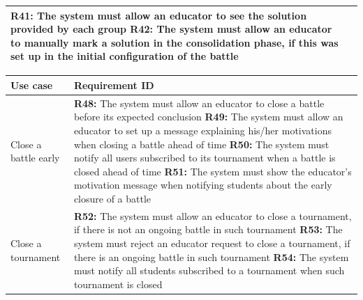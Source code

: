 \documentclass[../RASD.tex]{subfiles}
\begin{document}
\begin{table}[h!]
\begin{center}
\begin{tabular}{|m{10em}|m{30em}|}
            \textbf{R41:} The system must allow an educator to see the solution provided by each group\cellcolor{UCMappingSecondColumn}\newline
            \textbf{R42:} The system must allow an educator to manually mark a solution in the consolidation phase, if this was set up in the initial configuration of the battle\cellcolor{UCMappingSecondColumn}\\
            \hline
            \end{tabular}
        \end{center}
    \end{table}
    \newpage

    \begin{table}[h!]
        \begin{center}
            \begin{tabular}{|m{10em}|m{30em}|}
            \hline
            \rowcolor{UCMappingFirstRow}
            \textbf{Use case} & \textbf{Requirement ID}\\
            \hline
            Close a battle early \cellcolor{UCMappingFirstColumn} & \textbf{R48:} The system must allow an educator to close a battle before its expected conclusion\cellcolor{UCMappingSecondColumn}\newline
            \textbf{R49:} The system must allow an educator to set up a message explaining his/her motivations when closing a battle ahead of time\cellcolor{UCMappingSecondColumn}\newline
            \textbf{R50:} The system must notify all users subscribed to its tournament when a battle is closed ahead of time\cellcolor{UCMappingSecondColumn}\newline
            \textbf{R51:} The system must show the educator's motivation message when notifying students about the early closure of a battle\cellcolor{UCMappingSecondColumn}\\
            \hline
            Close a tournament \cellcolor{UCMappingFirstColumn}& \textbf{R52:} The system must allow an educator to close a tournament, if there is not an ongoing battle in such tournament\cellcolor{UCMappingSecondColumn}\newline
            \textbf{R53:} The system must reject an educator request to close a tournament, if there is an ongoing battle in such tournament\cellcolor{UCMappingSecondColumn}\newline
            \textbf{R54:} The system must notify all students subscribed to a tournament when such tournament is closed\cellcolor{UCMappingSecondColumn}\\
            \hline
        \end{tabular}
    \end{center}
    \end{table}
    \newpage
\end{document}
